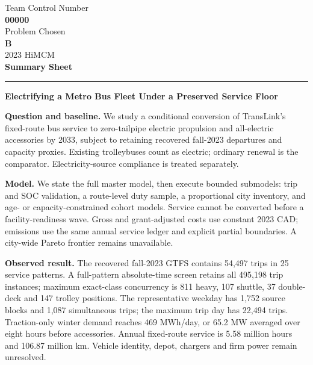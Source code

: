 \documentclass[12pt,letterpaper]{article}
\newcommand{\teamnumber}{00000} %
\begin{document}
\begin{center}
Team Control Number\\
{\Large\bfseries \teamnumber}\\[3pt]
Problem Chosen\\
{\Large\bfseries B}\\[3pt]
2023 HiMCM\\
\textbf{Summary Sheet}
\end{center}
\hrule
\vspace{0.5em}
\begin{center}
{\Large\bfseries Electrifying a Metro Bus Fleet Under a Preserved Service Floor}
\end{center}

\textbf{Question and baseline.} We study a conditional conversion of TransLink's fixed-route bus service to zero-tailpipe electric propulsion and all-electric accessories by 2033, subject to retaining recovered fall-2023 departures and capacity proxies. Existing trolleybuses count as electric; ordinary renewal is the comparator. Electricity-source compliance is treated separately.

\textbf{Model.} We state the full master model, then execute bounded submodels: trip and SOC validation, a route-level duty sample, a proportional city inventory, and age- or capacity-constrained cohort models. Service cannot be converted before a facility-readiness wave. Gross and grant-adjusted costs use constant 2023 CAD; emissions use the same annual service ledger and explicit partial boundaries. A city-wide Pareto frontier remains unavailable.

\textbf{Observed result.} The recovered fall-2023 GTFS contains 54,497 trips in 25 service patterns. A full-pattern absolute-time screen retains all 495,198 trip instances; maximum exact-class concurrency is 811 heavy, 107 shuttle, 37 double-deck and 147 trolley positions. The representative weekday has 1,752 source blocks and 1,087 simultaneous trips; the maximum trip day has 22,494 trips. Traction-only winter demand reaches 469 MWh/day, or 65.2 MW averaged over eight hours before accessories. Annual fixed-route service is 5.58 million hours and 106.87 million km. Vehicle identity, depot, chargers and firm power remain unresolved.\cite{gtfs2023,budget2025,eea2023,prati2025,bcvanderhoof}
\end{document}
